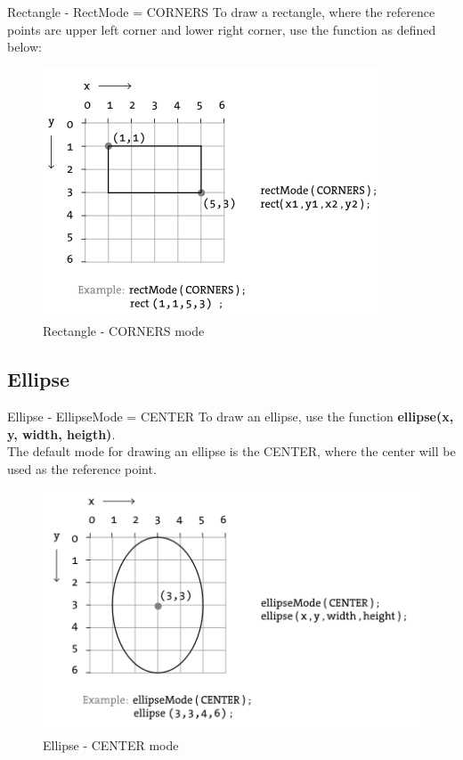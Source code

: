 \documentclass{beamer}
\begin{document}
\begin{frame}{Rectangle - RectMode = CORNERS}
To draw a rectangle, where the reference points are upper left corner
and lower right corner, use the function as defined below:\\

\begin{figure}[H]
\centerline{\includegraphics[scale=0.5]{rectangle_corners_mode.png}}
\caption{Rectangle - CORNERS mode}
\end{figure}
\end{frame}

\subsection{Ellipse}

\begin{frame}{Ellipse - EllipseMode = CENTER}
To draw an ellipse, use the function \textbf{ellipse(x, y, width, heigth)}.\\
The default mode for drawing an ellipse is the CENTER, where the center will
be used as the reference point.\\

\begin{figure}[H]
\centerline{\includegraphics[scale=0.5]{ellipse_center_mode.png}}
\caption{Ellipse - CENTER mode}
\end{figure}
\end{frame}
\end{document}
